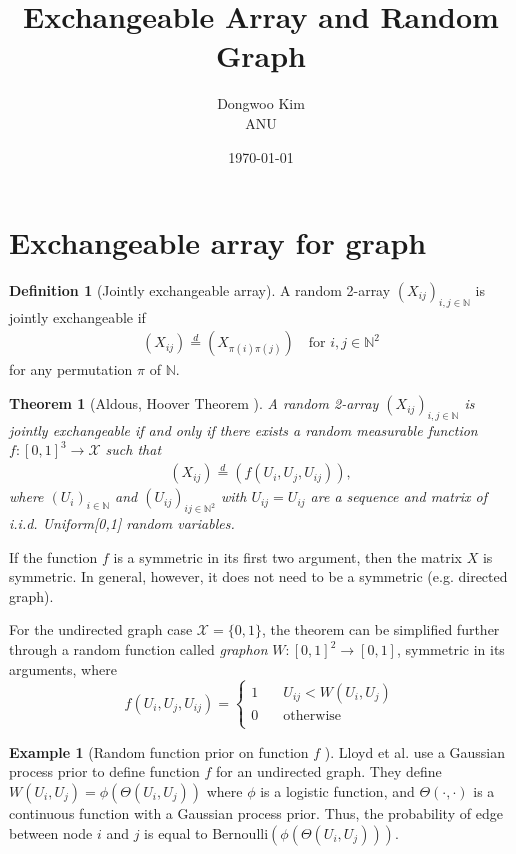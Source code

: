 \documentclass{article}
\title{Exchangeable Array and Random Graph}
\date{\today}
\author{Dongwoo Kim\\ANU}
\newtheorem{theorem}{Theorem} %
\theoremstyle{definition}
\newtheorem{definition}{Definition}
\newtheorem{example}{Example}[definition]
\begin{document}
\maketitle

\section{Exchangeable array for graph}
\begin{definition}[Jointly exchangeable array] A random 2-array $(X_{ij})_{i,j\in \mathbb{N}}$
is jointly exchangeable if
\begin{align}
(X_{ij}) \stackrel{d}{=} (X_{\pi(i)\pi(j)}) \quad \text{for } i,j \in \mathbb{N}^2
\end{align}
for any permutation $\pi$ of $\mathbb{N}$.
\end{definition}

\begin{theorem}[\label{aldous_hoover}Aldous, Hoover Theorem \citep{aldous1981representations,hoover1979relations}] A random 2-array $(X_{ij})_{i,j\in \mathbb{N}}$
is jointly exchangeable if and only if there exists a random measurable function $f:[0,1]^3 \rightarrow \mathcal{X}$ such that
\begin{align}
(X_{ij}) \stackrel{d}{=} (f(U_i, U_j, U_{ij})),
\end{align}
where $(U_{i})_{i \in \mathbb{N}}$ and $(U_{ij})_{ij\in\mathbb{N}^2}$ with $U_{ij} = U_{ij}$ are a sequence and matrix of i.i.d. Uniform[0,1] random variables.
\end{theorem}
If the function $f$ is a symmetric in its first two argument, then the matrix $X$ is symmetric. In general, however, it does not need to be a symmetric (e.g. directed graph).

For the undirected graph case $\mathcal{X} = \{0,1\}$, the theorem can be simplified further through a random function called \textit{graphon} $W:[0,1]^2 \rightarrow [0,1]$, symmetric in its arguments, where
\[ f(U_i, U_j, U_{ij}) = 
  \begin{cases}
    1       & \quad U_{ij} < W(U_i, U_j)\\
    0  & \quad \mathrm{otherwise}\\
  \end{cases}
\]

\begin{example}[Random function prior on function $f$ \citep{Lloyd2013}] Lloyd et al. use a Gaussian process prior to define function $f$ for an undirected graph. They define $W(U_i, U_j) = \phi(\Theta(U_i,U_j))$ where $\phi$ is a logistic function, and $\Theta(\cdot, \cdot)$ is a continuous function with a Gaussian process prior. Thus, the probability of edge between node $i$ and $j$ is equal to Bernoulli$(\phi(\Theta(U_i,U_j)))$.
\end{example}
\end{document}
